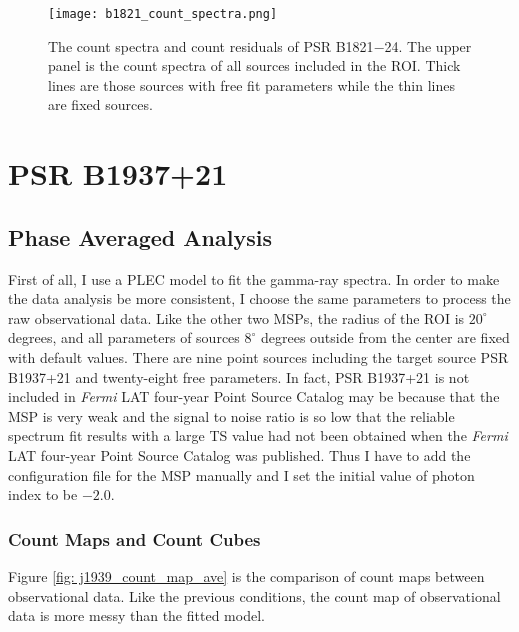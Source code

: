 \documentclass[a4paper, 12pt]{report}
\newcommand{\fgl}[0]{
  \textit{Fermi} LAT four-year Point Source Catalog
}
\begin{document}
      \begin{figure}[!htp]
        \centering
        \texttt{[image: b1821\_count\_spectra.png]}
        \caption[The count spectra and count residuals of PSR B1821$-$24.]
                {The count spectra and count residuals of PSR B1821$-$24.
                The upper panel is the count spectra of all sources included in the 
                ROI. Thick lines are those sources with free fit parameters 
                while the thin lines are fixed sources.} 
        \label{fig: b1821_count_spectra}
      \end{figure}


  \section{PSR B1937+21}
    \subsection{Phase Averaged Analysis}
      First of all, I use a PLEC model to fit the gamma-ray spectra. 
      In order to make the data analysis be more consistent, I choose the same parameters
      to process the raw observational data. Like the other two MSPs, the radius of the ROI 
      is $20^{\circ}$ degrees, and all parameters of sources $8^{\circ}$ degrees outside 
      from the center are fixed with default values. There are nine point sources including 
      the target source PSR B1937+21 and twenty-eight free parameters. In fact, PSR B1937+21
      is not included in \fgl{} may be because that the MSP is very weak and the signal to 
      noise ratio is so low that the reliable spectrum fit results with a large TS value 
      had not been obtained when the \fgl{} was published. Thus I have to add the 
      configuration file for the MSP manually and I set the initial value of photon index 
      to be $-2.0$.

      \subsubsection{Count Maps and Count Cubes}
        Figure \ref{fig: j1939_count_map_ave} is the comparison of count maps between 
        observational data. Like the previous conditions, the count map of observational data 
        is more messy than the fitted model. 
\end{document}
